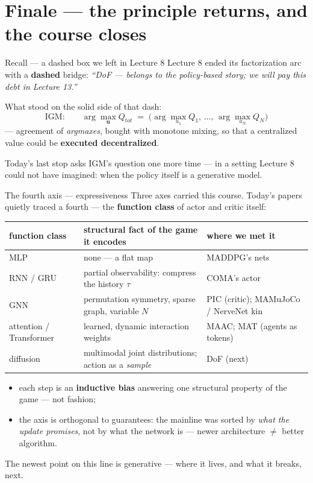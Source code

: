 \documentclass[10pt, aspectratio=169]{beamer}
\begin{document}
\section{Finale --- the principle returns, and the course closes}

\begin{frame}{Recall --- a dashed box we left in Lecture 8}
Lecture 8 ended its factorization arc with a \textbf{dashed} bridge: \emph{``DoF --- belongs to the policy-based story; we will pay this debt in Lecture 13.''}
\medskip

What stood on the solid side of that dash:
\[
\text{IGM:}\qquad \arg\max_{\mathbf{u}} Q_{tot} \;=\; \big( \arg\max_{u_1} Q_1,\, \dots,\, \arg\max_{u_N} Q_N \big)
\]
--- agreement of \emph{argmaxes}, bought with monotone mixing, so that a centralized value could be \textbf{executed decentralized}.
\medskip

\pause
Today's last stop asks IGM's question one more time --- in a setting Lecture 8 could not have imagined: \alert{when the policy itself is a generative model}.
\end{frame}

\begin{frame}{The fourth axis --- expressiveness}
Three axes carried this course. Today's papers quietly traced a \alert{fourth} --- the \textbf{function class} of actor and critic itself:
\smallskip
\begin{center}\scriptsize\renewcommand{\arraystretch}{1.4}
\begin{tabular}{l|l|l}
\textbf{function class} & \textbf{structural fact of the game it encodes} & \textbf{where we met it} \\
\hline
MLP & none --- a flat map & MADDPG's nets \\
RNN / GRU & \alert{partial observability}: compress the history $\tau$ & COMA's actor \\
GNN & permutation symmetry, sparse graph, variable $N$ & PIC (critic); MAMuJoCo / NerveNet kin \\
attention / Transformer & \alert{learned, dynamic} interaction weights & MAAC; MAT (agents as tokens) \\
diffusion & \alert{multimodal joint distributions}; action as a \emph{sample} & DoF (next) \\
\end{tabular}
\end{center}
\smallskip

\pause
\begin{itemize}\setlength\itemsep{1pt}
\item each step is an \textbf{inductive bias} answering one structural property of the game --- not fashion;
\item the axis is \alert{orthogonal to guarantees}: the mainline was sorted by \emph{what the update promises}, not by what the network is --- newer architecture $\neq$ better algorithm.
\end{itemize}
\smallskip
\pause
{\footnotesize The newest point on this line is generative --- where it lives, and what it breaks, next.}
\end{frame}
\end{document}
